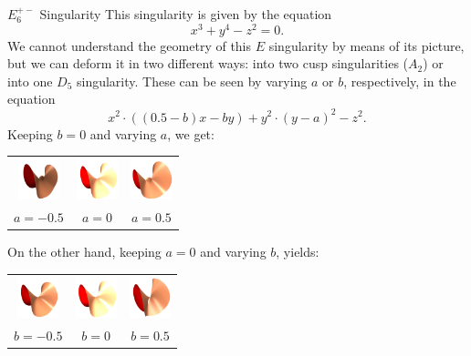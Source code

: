 \begin{surferPage}[E6+- Singularity]{$E_6^{+-}$ Singularity}
	This singularity is given by the equation
	\[
		x^3+y^4-z^2=0.
	\]
	We cannot understand the geometry of this $E$ singularity by means of its picture, but we can deform it in two different ways: into two cusp singularities ($A_2$) or into one $D_5$ singularity. These can be seen by varying $a$ or $b$, respectively, in the equation
	\[
		x^2\cdot ((0.5-b)x-by)+y^2\cdot(y-a)^2-z^2.
	\]
	Keeping $b=0$ and varying $a$, we get:
	\begin{center}
		\begin{tabular}{c@{\quad}c@{\quad}c}
			\includegraphics[width=1.2cm]{../../common/images/E6pm_1} &
			\includegraphics[width=1.2cm]{../../common/images/E6pm_0} &
			\includegraphics[width=1.2cm]{../../common/images/E6pm_2}\\
			$a=-0.5$ &
			$a=0$ &
			$a=0.5$
		\end{tabular}
	\end{center}
	On the other hand, keeping $a=0$ and varying $b$, yields:
	\begin{center}
		\begin{tabular}{c@{\quad}c@{\quad}c}
			\includegraphics[width=1.2cm]{../../common/images/E6pm_4} &
			\includegraphics[width=1.2cm]{../../common/images/E6pm_0} &
			\includegraphics[width=1.2cm]{../../common/images/E6pm_5}\\
			$b=-0.5$ &
			$b=0$ &
			$b=0.5$
		\end{tabular}
	\end{center}
\end{surferPage}
